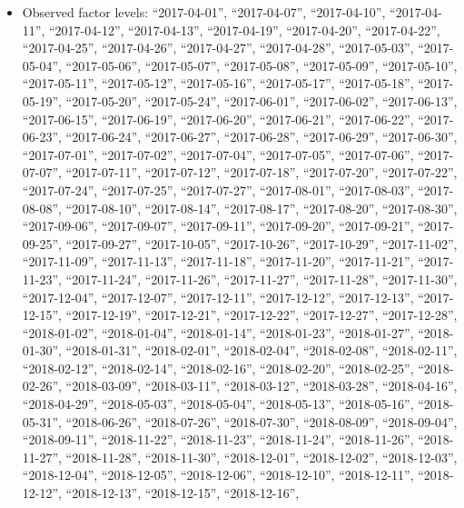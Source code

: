 \documentclass[
  letterpaper,
  DIV=11,
  numbers=noendperiod]{scrartcl}
\providecommand{\tightlist}{%
  \setlength{\itemsep}{0pt}\setlength{\parskip}{0pt}}
\begin{document}
\begin{itemize}
\tightlist
\item
  Observed factor levels: ``2017-04-01'', ``2017-04-07'',
  ``2017-04-10'', ``2017-04-11'', ``2017-04-12'', ``2017-04-13'',
  ``2017-04-19'', ``2017-04-20'', ``2017-04-22'', ``2017-04-25'',
  ``2017-04-26'', ``2017-04-27'', ``2017-04-28'', ``2017-05-03'',
  ``2017-05-04'', ``2017-05-06'', ``2017-05-07'', ``2017-05-08'',
  ``2017-05-09'', ``2017-05-10'', ``2017-05-11'', ``2017-05-12'',
  ``2017-05-16'', ``2017-05-17'', ``2017-05-18'', ``2017-05-19'',
  ``2017-05-20'', ``2017-05-24'', ``2017-06-01'', ``2017-06-02'',
  ``2017-06-13'', ``2017-06-15'', ``2017-06-19'', ``2017-06-20'',
  ``2017-06-21'', ``2017-06-22'', ``2017-06-23'', ``2017-06-24'',
  ``2017-06-27'', ``2017-06-28'', ``2017-06-29'', ``2017-06-30'',
  ``2017-07-01'', ``2017-07-02'', ``2017-07-04'', ``2017-07-05'',
  ``2017-07-06'', ``2017-07-07'', ``2017-07-11'', ``2017-07-12'',
  ``2017-07-18'', ``2017-07-20'', ``2017-07-22'', ``2017-07-24'',
  ``2017-07-25'', ``2017-07-27'', ``2017-08-01'', ``2017-08-03'',
  ``2017-08-08'', ``2017-08-10'', ``2017-08-14'', ``2017-08-17'',
  ``2017-08-20'', ``2017-08-30'', ``2017-09-06'', ``2017-09-07'',
  ``2017-09-11'', ``2017-09-20'', ``2017-09-21'', ``2017-09-25'',
  ``2017-09-27'', ``2017-10-05'', ``2017-10-26'', ``2017-10-29'',
  ``2017-11-02'', ``2017-11-09'', ``2017-11-13'', ``2017-11-18'',
  ``2017-11-20'', ``2017-11-21'', ``2017-11-23'', ``2017-11-24'',
  ``2017-11-26'', ``2017-11-27'', ``2017-11-28'', ``2017-11-30'',
  ``2017-12-04'', ``2017-12-07'', ``2017-12-11'', ``2017-12-12'',
  ``2017-12-13'', ``2017-12-15'', ``2017-12-19'', ``2017-12-21'',
  ``2017-12-22'', ``2017-12-27'', ``2017-12-28'', ``2018-01-02'',
  ``2018-01-04'', ``2018-01-14'', ``2018-01-23'', ``2018-01-27'',
  ``2018-01-30'', ``2018-01-31'', ``2018-02-01'', ``2018-02-04'',
  ``2018-02-08'', ``2018-02-11'', ``2018-02-12'', ``2018-02-14'',
  ``2018-02-16'', ``2018-02-20'', ``2018-02-25'', ``2018-02-26'',
  ``2018-03-09'', ``2018-03-11'', ``2018-03-12'', ``2018-03-28'',
  ``2018-04-16'', ``2018-04-29'', ``2018-05-03'', ``2018-05-04'',
  ``2018-05-13'', ``2018-05-16'', ``2018-05-31'', ``2018-06-26'',
  ``2018-07-26'', ``2018-07-30'', ``2018-08-09'', ``2018-09-04'',
  ``2018-09-11'', ``2018-11-22'', ``2018-11-23'', ``2018-11-24'',
  ``2018-11-26'', ``2018-11-27'', ``2018-11-28'', ``2018-11-30'',
  ``2018-12-01'', ``2018-12-02'', ``2018-12-03'', ``2018-12-04'',
  ``2018-12-05'', ``2018-12-06'', ``2018-12-10'', ``2018-12-11'',
  ``2018-12-12'', ``2018-12-13'', ``2018-12-15'', ``2018-12-16'',

\end{itemize}
\end{document}
